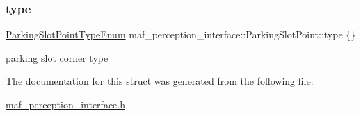 \subsubsection{\texorpdfstring{type}{type}}
{\footnotesize\ttfamily \hyperlink{structmaf__perception__interface_1_1ParkingSlotPointTypeEnum}{Parking\+Slot\+Point\+Type\+Enum} maf\+\_\+perception\+\_\+interface\+::\+Parking\+Slot\+Point\+::type \{\}}



parking slot corner type 



The documentation for this struct was generated from the following file\+:\begin{DoxyCompactItemize}
\item 
\hyperlink{maf__perception__interface_8h}{maf\+\_\+perception\+\_\+interface.\+h}\end{DoxyCompactItemize}
